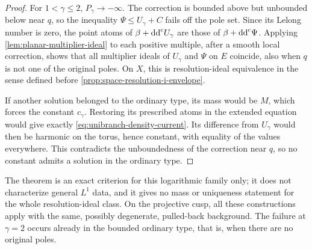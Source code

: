 \begin{proof}
For $1<\gamma\leq2$, $P_\gamma\to-\infty$. The correction is bounded above but unbounded below near $q$, so the inequality $\Psi\leq U_\gamma+C$ fails off the pole set. Since its Lelong number is zero, the point atoms of $\beta+\mathrm{dd}^{\mathrm{c}} U_\gamma$ are those of $\beta+\mathrm{dd}^{\mathrm{c}}\Psi$. Applying \cref{lem:planar-multiplier-ideal} to each positive multiple, after a smooth local correction, shows that all multiplier ideals of $U_\gamma$ and $\Psi$ on $E$ coincide, also when $q$ is not one of the original poles. On $X$, this is resolution-ideal equivalence in the sense defined before \cref{prop:space-resolution-i-envelope}.

If another solution belonged to the ordinary type, its mass would be $M$, which forces the constant $c_\gamma$. Restoring its prescribed atoms in the extended equation would give exactly \eqref{eq:unibranch-density-current}. Its difference from $U_\gamma$ would then be harmonic on the torus, hence constant, with equality of the values everywhere. This contradicts the unboundedness of the correction near $q$, so no constant admits a solution in the ordinary type.
\end{proof}

The theorem is an exact criterion for this logarithmic family only; it does not characterize general $L^1$ data, and it gives no mass or uniqueness statement for the whole resolution-ideal class. On the projective cusp, all these constructions apply with the same, possibly degenerate, pulled-back background. The failure at $\gamma=2$ occurs already in the bounded ordinary type, that is, when there are no original poles.
